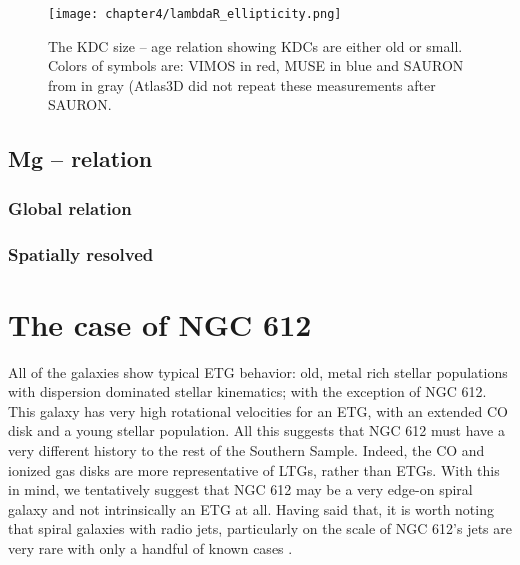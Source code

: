 		\begin{figure}
			\centering
			\texttt{[image: chapter4/lambdaR\_ellipticity.png]}
			\caption[KDC dichotomy]{The KDC size -- age relation showing KDCs are either old or small. Colors of symbols are: VIMOS in red, MUSE in blue and SAURON from \citet{Kuntschner2010} in gray (Atlas3D did not repeat these measurements after SAURON.}
			\label{fig:KDC}
		\end{figure}


	\subsection{Mg -- \textsigma relation}
		\label{subsec:Mgsigma}

		\subsubsection{Global relation}

		\subsubsection{Spatially resolved}

\section{The case of NGC 612}
	\label{sec:NGC612}
	All of the galaxies show typical ETG behavior: old, metal rich stellar populations with dispersion dominated stellar kinematics; with the exception of NGC 612. This galaxy has very high rotational velocities for an ETG, with an extended CO disk and a young stellar population. All this suggests that NGC 612 must have a very different history to the rest of the Southern Sample. Indeed, the CO and ionized gas disks are more representative of LTGs, rather than ETGs. With this in mind, we tentatively suggest that NGC 612 may be a very edge-on spiral galaxy and not intrinsically an ETG at all. Having said that, it is worth noting that spiral galaxies with radio jets, particularly on the scale of NGC 612's jets are very rare with only a handful of known cases \citep{}. 